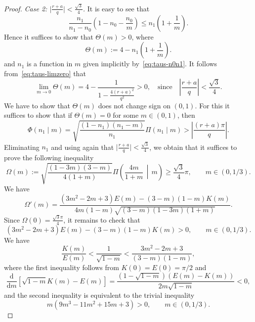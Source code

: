 \documentclass[10pt,a4paper]{amsart}
\newcommand{\bigmid}{\,\middle\vert\,}
\renewcommand{\d}{\mathrm{d}}
\begin{document}
\begin{proof}
\textit{Case 2: \(\bigl|\frac{r+a}q\bigr|<\frac{\sqrt 3}4\).} It is easy to see
that
\[
\frac{n_1}{n_1-n_0}\left(1-n_0-\frac{n_0}m\right)\le
n_1\left(1+\frac{1}m\right).
\]
Hence it suffices to show that \(\Theta(m)>0\), where
\[
\Theta(m):=4-n_1\left(1+\frac{1}m\right).
\]
and \(n_1\) is a function in \(m\) given implicitly by~\eqref{eq:taus-n0n1}. It
follows from~\eqref{eq:taus-limzero} that
\[
\lim_{m\to 0}\Theta(m)=4-\frac{1}{1-\frac{4(r+a)^2}{q^2}}>0,\quad\text{since}\quad
\left|\frac{r+a}q\right|<\frac{\sqrt 3}4.
\]
We have to show that \(\Theta(m)\) does not change sign on \((0,1)\). For this
it suffices to show that if \(\Theta(m)=0\) for some \(m\in (0,1)\), then
\[
\Phi(n_1\mid m)=\sqrt{\frac{(1-n_1)(n_1-m)}{n_1}}\Pi(n_1\mid m)>
\left|\frac{(r+a)\pi}q\right|.
\]
Eliminating \(n_1\) and using again that \(\bigl|\frac{r+a}q\bigr|<\frac{\sqrt
3}4\), we obtain that it suffices to prove the following inequality
\[
\Omega(m):=\sqrt{\frac{(1-3m)(3-m)}{4(1+m)}}\Pi\left(\frac{4m}{1+m}\bigmid
m\right)\ge\frac{\sqrt 3}4\pi,\qquad m\in (0,1/3).
\]
We have
\[
\Omega'(m)=\frac{(3m^2-2m+3)E(m)-(3-m)(1-m)K(m)}{4m(1-m)\sqrt{(3-m)(1-3m)(1+m)}}.
\]
Since \(\Omega(0)=\frac{\sqrt 3\pi}4\), it remains to check that
\[
(3m^2-2m+3)E(m)-(3-m)(1-m)K(m)>0,\qquad m\in (0,1/3).
\]
We have
\[
\frac{K(m)}{E(m)}<\frac{1}{\sqrt{1-m}}<\frac{3m^2-2m+3}{(3-m)(1-m)},
\]
where the first inequality follows from \(K(0)=E(0)=\pi/2\) and
\[
\frac{\d}{\d m}\left[\sqrt{1-m}K(m)-E(m)\right]=
\frac{(1-\sqrt{1-m})(E(m)-K(m))}{2m\sqrt{1-m}}<0,
\]
and the second inequality is equivalent to the trivial inequality
\[
m(9m^3-11m^2+15m+3)>0,\qquad m\in (0,1/3).
\]
\end{proof}
\end{document}
